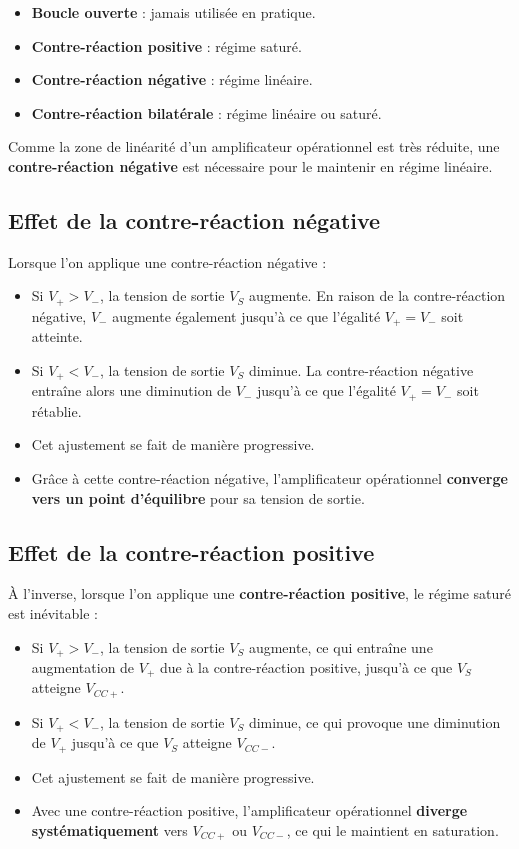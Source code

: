 \begin{itemize}
    \item \textbf{Boucle ouverte} : jamais utilisée en pratique.
    \item \textbf{Contre-réaction positive} : r\'egime satur\'e.
    \item \textbf{Contre-réaction négative} : r\'egime lin\'eaire.
    \item \textbf{Contre-réaction bilatérale} : r\'egime lin\'eaire ou satur\'e.
\end{itemize}

Comme la zone de linéarité d’un amplificateur opérationnel est très réduite, une 
\textbf{contre-réaction négative} est nécessaire pour le maintenir en régime 
linéaire.

\subsection{Effet de la contre-réaction négative}

Lorsque l’on applique une contre-réaction négative :
\begin{itemize}
    \item Si \( V_+ > V_- \), la tension de sortie \( V_S \) augmente. En raison de la contre-réaction négative, \( V_- \) augmente également jusqu’à ce que l’égalité \( V_+ = V_- \) soit atteinte.
    \item Si \( V_+ < V_- \), la tension de sortie \( V_S \) diminue. La contre-réaction négative entraîne alors une diminution de \( V_- \) jusqu’à ce que l’égalité \( V_+ = V_- \) soit rétablie.
    \item Cet ajustement se fait de manière progressive.
    \item Grâce à cette contre-réaction négative, l’amplificateur opérationnel \textbf{converge vers un point d’équilibre} pour sa tension de sortie.
\end{itemize}

\subsection{Effet de la contre-réaction positive}

À l’inverse, lorsque l’on applique une \textbf{contre-réaction positive}, le 
régime saturé est inévitable :

\begin{itemize}
    \item Si \( V_+ > V_- \), la tension de sortie \( V_S \) augmente, ce qui entraîne une augmentation de \( V_+ \) due à la contre-réaction positive, jusqu’à ce que \( V_S \) atteigne \( V_{CC+} \).
    \item Si \( V_+ < V_- \), la tension de sortie \( V_S \) diminue, ce qui provoque une diminution de \( V_+ \) jusqu’à ce que \( V_S \) atteigne \( V_{CC-} \).
    \item Cet ajustement se fait de manière progressive.
    \item Avec une contre-réaction positive, l’amplificateur opérationnel \textbf{diverge systématiquement} vers \( V_{CC+} \) ou \( V_{CC-} \), ce qui le maintient en saturation.
\end{itemize}

